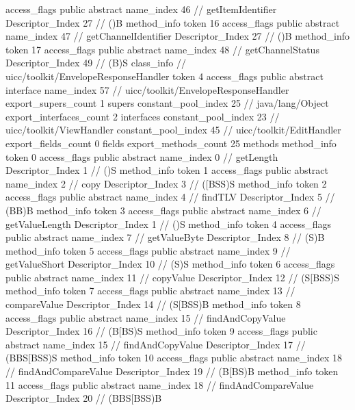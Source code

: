 {{{{{					access_flags	public abstract
					name_index	46		// getItemIdentifier
					Descriptor_Index	27		// ()B
				}
				method_info {
					token	16
					access_flags	public abstract
					name_index	47		// getChannelIdentifier
					Descriptor_Index	27		// ()B
				}
				method_info {
					token	17
					access_flags	public abstract
					name_index	48		// getChannelStatus
					Descriptor_Index	49		// (B)S
				}
			}
		}
		class_info {		// uicc/toolkit/EnvelopeResponseHandler
			token	4
			access_flags	public abstract interface
			name_index	57		// uicc/toolkit/EnvelopeResponseHandler
			export_supers_count	1
			supers {
				constant_pool_index	25		// java/lang/Object
			}
			export_interfaces_count	2
			interfaces {
				constant_pool_index	23		// uicc/toolkit/ViewHandler
				constant_pool_index	45		// uicc/toolkit/EditHandler
			}
			export_fields_count	0
			fields {
			}
			export_methods_count	25
			methods {
				method_info {
					token	0
					access_flags	public abstract
					name_index	0		// getLength
					Descriptor_Index	1		// ()S
				}
				method_info {
					token	1
					access_flags	public abstract
					name_index	2		// copy
					Descriptor_Index	3		// ([BSS)S
				}
				method_info {
					token	2
					access_flags	public abstract
					name_index	4		// findTLV
					Descriptor_Index	5		// (BB)B
				}
				method_info {
					token	3
					access_flags	public abstract
					name_index	6		// getValueLength
					Descriptor_Index	1		// ()S
				}
				method_info {
					token	4
					access_flags	public abstract
					name_index	7		// getValueByte
					Descriptor_Index	8		// (S)B
				}
				method_info {
					token	5
					access_flags	public abstract
					name_index	9		// getValueShort
					Descriptor_Index	10		// (S)S
				}
				method_info {
					token	6
					access_flags	public abstract
					name_index	11		// copyValue
					Descriptor_Index	12		// (S[BSS)S
				}
				method_info {
					token	7
					access_flags	public abstract
					name_index	13		// compareValue
					Descriptor_Index	14		// (S[BSS)B
				}
				method_info {
					token	8
					access_flags	public abstract
					name_index	15		// findAndCopyValue
					Descriptor_Index	16		// (B[BS)S
				}
				method_info {
					token	9
					access_flags	public abstract
					name_index	15		// findAndCopyValue
					Descriptor_Index	17		// (BBS[BSS)S
				}
				method_info {
					token	10
					access_flags	public abstract
					name_index	18		// findAndCompareValue
					Descriptor_Index	19		// (B[BS)B
				}
				method_info {
					token	11
					access_flags	public abstract
					name_index	18		// findAndCompareValue
					Descriptor_Index	20		// (BBS[BSS)B
}}}}}
